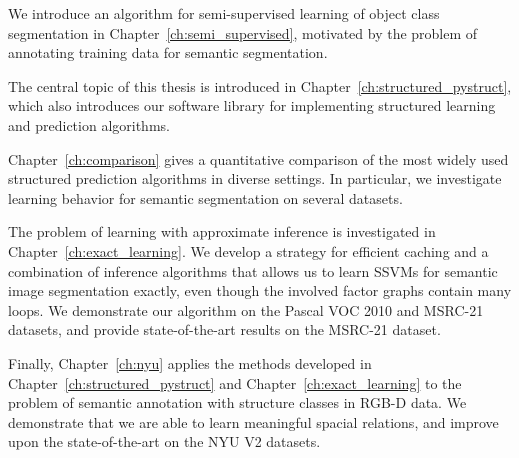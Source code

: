 We introduce an algorithm for semi-supervised learning of object class
segmentation in Chapter~\ref{ch:semi_supervised}, motivated by the problem of
annotating training data for semantic segmentation.

The central topic of this thesis is introduced in
Chapter~\ref{ch:structured_pystruct}, which also introduces our software
library for implementing structured learning and prediction algorithms.

Chapter~\ref{ch:comparison} gives a quantitative comparison of the most widely
used structured prediction algorithms in diverse settings.
In particular, we investigate learning behavior for
semantic segmentation on several datasets.

The problem of learning with approximate inference is investigated in
Chapter~\ref{ch:exact_learning}.  We develop a strategy for efficient caching
and a combination of inference algorithms that allows us to learn SSVMs for
semantic image segmentation exactly, even though the involved factor graphs
contain many loops. We demonstrate our algorithm on the Pascal VOC 2010 and MSRC-21 datasets,
and provide state-of-the-art results on the MSRC-21 dataset.

Finally, Chapter~\ref{ch:nyu} applies the methods developed in
Chapter~\ref{ch:structured_pystruct} and Chapter~\ref{ch:exact_learning} to the
problem of semantic annotation with structure classes in RGB-D data. We
demonstrate that we are able to learn meaningful spacial relations, and improve
upon the state-of-the-art on the NYU V2 datasets.

